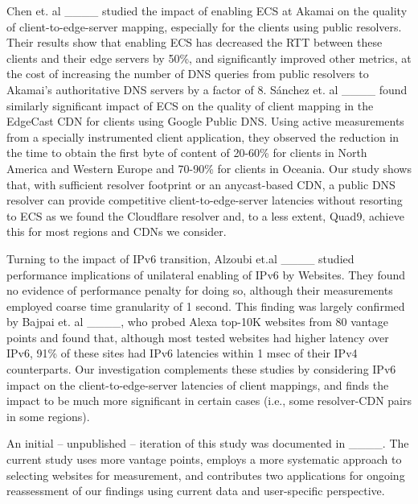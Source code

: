 Chen et. al ____ studied the impact of enabling ECS at Akamai on the quality of client-to-edge-server mapping, especially for the clients using public resolvers. Their results show that enabling ECS has decreased the RTT between these clients and their edge servers by 50\%, and significantly improved other metrics, at the cost of increasing the number of DNS queries from public resolvers to Akamai's authoritative DNS servers by a factor of 8. S\'anchez et. al ____ found similarly significant impact of ECS on the quality of client mapping in the EdgeCast CDN for clients using Google Public DNS. Using active measurements from a specially instrumented client application, they observed the reduction in the time to obtain the first byte of content of 20-60\% for clients in North America and Western Europe and 70-90\% for clients in Oceania.   Our study shows that, with sufficient resolver footprint or an anycast-based CDN, a public DNS resolver can provide competitive client-to-edge-server latencies without resorting to ECS as we found the Cloudflare resolver and, to a less extent, Quad9, achieve this for most regions and CDNs we consider.  

Turning to the impact of IPv6 transition, Alzoubi et.al
____ studied performance implications of
unilateral enabling of IPv6 by Websites. They found no evidence of
performance penalty for doing so, although their measurements employed
coarse time granularity of 1 second. This finding was largely
confirmed by Bajpai et. al  ____, who probed
Alexa top-10K websites from 80 vantage points and 
found that, although most tested websites had higher latency over IPv6,
91\% of these sites had IPv6 latencies within 1 msec of their IPv4
counterparts. Our investigation complements these studies by
considering IPv6 impact on the client-to-edge-server latencies of 
client mappings, and finds the impact to be much more significant in certain
cases (i.e., some resolver-CDN pairs in some regions).

An initial -- unpublished -- iteration of this study was documented in
____.  The current study uses more vantage points, employs a
more systematic approach to selecting websites for measurement, and
contributes two applications for ongoing reassessment of our findings
using current data and user-specific perspective.
\vspace{-2mm}